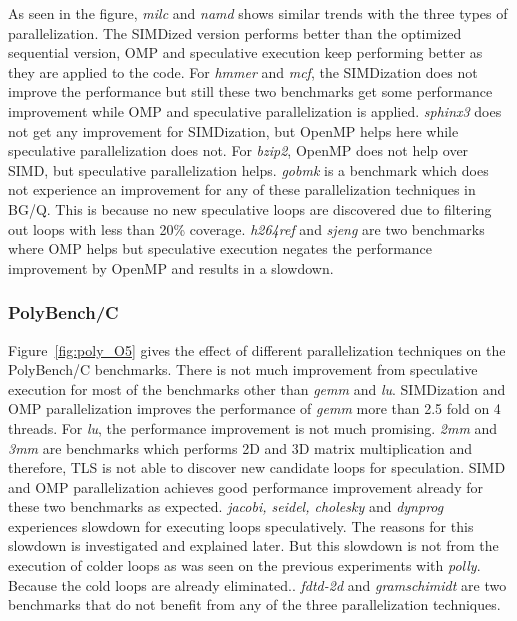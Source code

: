 \documentclass[10pt]{report}          %
\begin{document}
As seen in the figure, \textit{milc} and \textit{namd} shows similar trends with the three types of parallelization.  The SIMDized version performs better than the optimized sequential version, OMP and speculative execution keep performing better as they are applied to the code.  For \textit{hmmer} and \textit{mcf}, the SIMDization does not improve the performance but still these two benchmarks get some performance improvement while OMP and speculative parallelization is applied. \textit{sphinx3} does not get any improvement for SIMDization, but OpenMP helps here while speculative parallelization does not.  For \textit{bzip2}, OpenMP does not help over SIMD, but speculative parallelization helps.  \textit{gobmk} is a benchmark which does not experience an improvement for any of these parallelization techniques in BG/Q. This is because no new speculative loops are discovered due to filtering out loops with less than 20\% coverage.  \textit{h264ref} and \textit{sjeng} are two benchmarks where OMP helps but speculative execution negates the performance improvement by OpenMP and results in a slowdown.

\subsubsection{PolyBench/C}

Figure~\ref{fig:poly_O5} gives the effect of different parallelization techniques on the PolyBench/C benchmarks. There is not much improvement from speculative execution for most of the benchmarks other than \textit{gemm} and \textit{lu}. SIMDization and OMP parallelization improves the performance of \textit{gemm} more than 2.5 fold on 4 threads.  For \textit{lu}, the performance improvement is not much promising. \textit{2mm} and \textit{3mm} are benchmarks which performs 2D and 3D matrix multiplication and therefore, TLS is not able to discover new candidate loops for speculation.  SIMD and OMP parallelization achieves good performance improvement already for these two benchmarks as expected. \textit{ jacobi, seidel, cholesky} and \textit{dynprog} experiences slowdown for executing loops speculatively.  The reasons for this slowdown is investigated and explained later.  But this slowdown is not from the execution of colder loops as was seen on the previous experiments with \textit{polly}.  Because the cold loops are already eliminated..  \textit{fdtd-2d} and \textit{gramschimidt} are two benchmarks that do not benefit from any of the three parallelization techniques.
\end{document}
